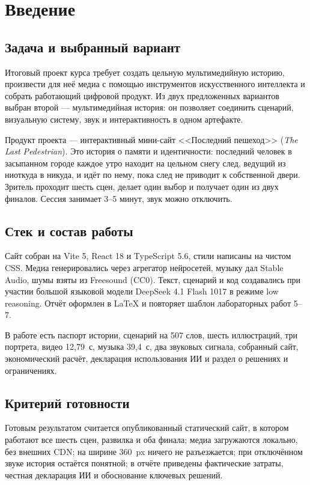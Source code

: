 \documentclass[12pt, a4paper]{article}
\begin{document}
\section{Введение}

\subsection{Задача и выбранный вариант}
Итоговый проект курса требует создать цельную мультимедийную историю, произвести для неё медиа с помощью инструментов искусственного интеллекта и собрать работающий цифровой продукт. Из двух предложенных вариантов выбран второй --- мультимедийная история: он позволяет соединить сценарий, визуальную систему, звук и интерактивность в одном артефакте.

Продукт проекта --- интерактивный мини-сайт <<Последний пешеход>> (\emph{The Last Pedestrian}). Это история о памяти и идентичности: последний человек в засыпанном городе каждое утро находит на цельном снегу след, ведущий из ниоткуда в никуда, и идёт по нему, пока след не приводит к собственной двери. Зритель проходит шесть сцен, делает один выбор и получает один из двух финалов. Сессия занимает 3--5 минут, звук можно отключить.

\subsection{Стек и состав работы}
Сайт собран на Vite 5, React 18 и TypeScript 5.6, стили написаны на чистом CSS. Медиа генерировались через агрегатор нейросетей, музыку дал Stable Audio, шумы взяты из Freesound (CC0). Текст, сценарий и код создавались при участии большой языковой модели DeepSeek 4.1 Flash 1017 в режиме low reasoning. Отчёт оформлен в \LaTeX{} и повторяет шаблон лабораторных работ 5--7.

В работе есть паспорт истории, сценарий на 507 слов, шесть иллюстраций, три портрета, видео 12{,}79~с, музыка 39{,}4~с, два звуковых сигнала, собранный сайт, экономический расчёт, декларация использования ИИ и раздел о решениях и ограничениях.

\subsection{Критерий готовности}
Готовым результатом считается опубликованный статический сайт, в котором работают все шесть сцен, развилка и оба финала; медиа загружаются локально, без внешних CDN; на ширине 360~px ничего не разъезжается; при отключённом звуке история остаётся понятной; в отчёте приведены фактические затраты, честная декларация ИИ и обоснование ключевых решений.
\end{document}

